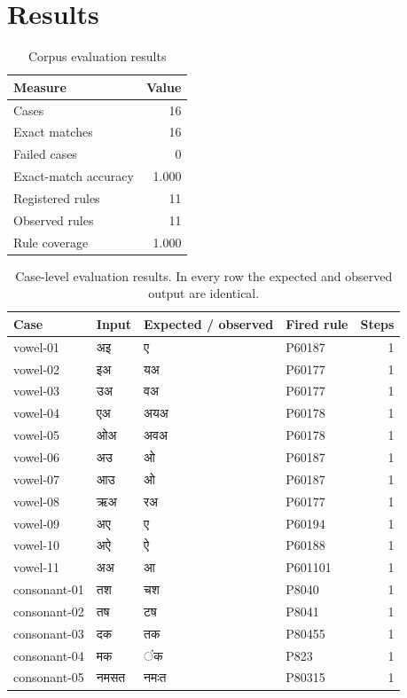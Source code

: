 \documentclass[conference]{IEEEtran}
\newcommand{\skt}[1]{{\devanagarifont #1}}
\begin{document}
\section{Results}
\label{sec:results}
\begin{table}[t]
\caption{Corpus evaluation results}
\label{tab:results}
\centering
\begin{tabular}{lr}
\toprule
Measure & Value \\
\midrule
Cases & 16 \\
Exact matches & 16 \\
Failed cases & 0 \\
Exact-match accuracy & 1.000 \\
Registered rules & 11 \\
Observed rules & 11 \\
Rule coverage & 1.000 \\
\bottomrule
\end{tabular}
\end{table}

\begin{table}[t]
\caption{Case-level evaluation results. In every row the expected and observed output are identical.}
\label{tab:case-results}
\centering
\small
\begin{tabular}{llllr}
\toprule
Case & Input & Expected / observed & Fired rule & Steps \\
\midrule
vowel-01 & \skt{अइ} & \skt{ए} & P60187 & 1 \\
vowel-02 & \skt{इअ} & \skt{यअ} & P60177 & 1 \\
vowel-03 & \skt{उअ} & \skt{वअ} & P60177 & 1 \\
vowel-04 & \skt{एअ} & \skt{अयअ} & P60178 & 1 \\
vowel-05 & \skt{ओअ} & \skt{अवअ} & P60178 & 1 \\
vowel-06 & \skt{अउ} & \skt{ओ} & P60187 & 1 \\
vowel-07 & \skt{आउ} & \skt{ओ} & P60187 & 1 \\
vowel-08 & \skt{ऋअ} & \skt{रअ} & P60177 & 1 \\
vowel-09 & \skt{अए} & \skt{ए} & P60194 & 1 \\
vowel-10 & \skt{अऐ} & \skt{ऐ} & P60188 & 1 \\
vowel-11 & \skt{अअ} & \skt{आ} & P601101 & 1 \\
consonant-01 & \skt{तश} & \skt{चश} & P8040 & 1 \\
consonant-02 & \skt{तष} & \skt{टष} & P8041 & 1 \\
consonant-03 & \skt{दक} & \skt{तक} & P80455 & 1 \\
consonant-04 & \skt{मक} & \skt{ंक} & P823 & 1 \\
consonant-05 & \skt{नमसत} & \skt{नमःत} & P80315 & 1 \\
\bottomrule
\end{tabular}
\end{table}
\end{document}
